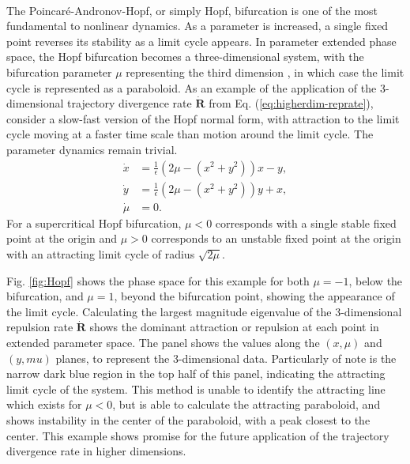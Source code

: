 \documentclass[twocolumn]{svjour3}
\begin{document}
 \\
The Poincar\'e-Andronov-Hopf, or simply Hopf, bifurcation is one of the most fundamental to nonlinear dynamics. As a parameter is increased, a single fixed point reverses its stability as a limit cycle appears. In parameter extended phase space, the Hopf bifurcation becomes a three-dimensional system, with the bifurcation parameter $\mu$ representing the third dimension \cite{wiggins2003introduction}, in which case the limit cycle is represented as a paraboloid. As an example of the application of the 3-dimensional trajectory divergence rate $\dot{\textbf{R}}$ from Eq. (\ref{eq:higherdim-reprate}), consider a slow-fast version of the Hopf normal form, with attraction to the limit cycle moving at a faster time scale than motion around the limit cycle. The parameter dynamics remain trivial.	
\begin{equation}
\begin{aligned}
\dot{x} &= \frac{1}{\epsilon}\left(2\mu-\left(x^2+y^2\right)\right)x-y, \\
\dot{y} &= \frac{1}{\epsilon}\left(2\mu-\left(x^2+y^2\right)\right)y+x, \\
\dot{\mu} &= 0.
\end{aligned}
\label{eq:Hopf}
\end{equation}
For a supercritical Hopf bifurcation, $\mu<0$ corresponds with a single stable fixed point at the origin and $\mu>0$ corresponds to an unstable fixed point at the origin with an attracting limit cycle of radius $\sqrt{2\mu}$.

Fig. \ref{fig:Hopf} shows the phase space for this example for both $\mu=-1$, below the bifurcation, and $\mu=1$, beyond the bifurcation point, showing the appearance of the limit cycle. Calculating the largest magnitude eigenvalue of the 3-dimensional repulsion rate $\dot{\mathbf{R}}$ shows the dominant attraction or repulsion at each point in extended parameter space. The panel shows the values along the $(x,\mu)$ and $(y,mu)$ planes, to represent the 3-dimensional data. Particularly of note is the narrow dark blue region in the top half of this panel, indicating the attracting limit cycle of the system. This method is unable to identify the attracting line which exists for $\mu<0$, but is able to calculate the attracting paraboloid, and shows instability in the center of the paraboloid, with a peak closest to the center. This example shows promise for the future application of the trajectory divergence rate in higher dimensions.
\end{document}
